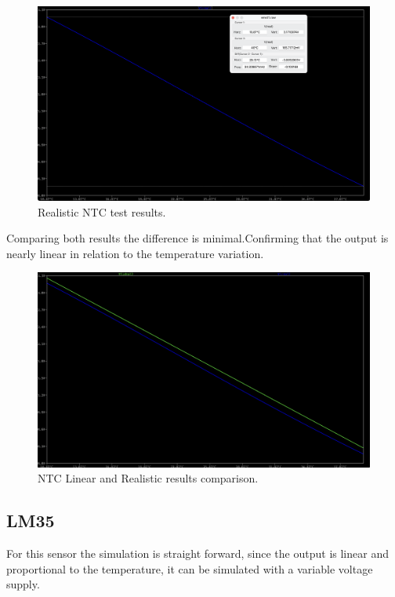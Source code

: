 \documentclass[12pt]{article}
\begin{document}
    \begin{figure}[H] 
        \centering
        \includegraphics*[scale = 0.3]{images/NTCRealRes.png}
        \caption{Realistic NTC test results.}
        \label{wrap-fig:1}
    \end{figure}

    Comparing both results the difference is minimal.Confirming that the output is nearly linear in relation to the temperature variation.
    
    \begin{figure}[H] 
        \centering
        \includegraphics*[scale = 0.3]{images/NTCRealLinearComp.png}
        \caption{NTC Linear and Realistic results comparison.}
        \label{wrap-fig:1}
    \end{figure}


\subsection{LM35}

    For this sensor the simulation is straight forward, since the output is linear and proportional to the temperature, 
    it can be simulated with a variable voltage supply. 
    
\end{document}
